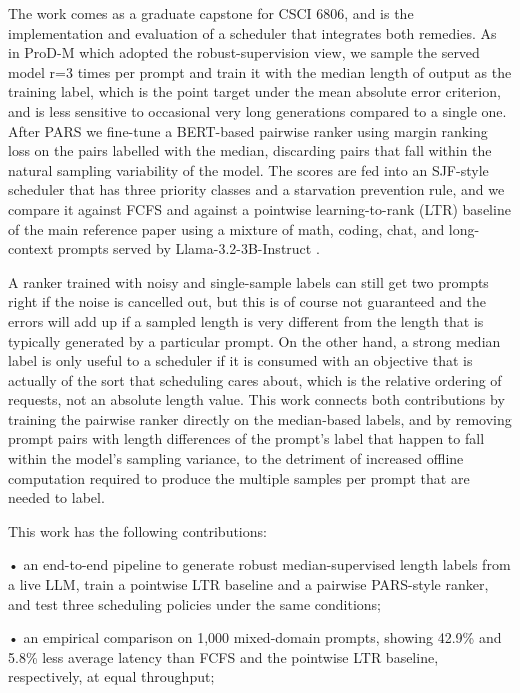 \documentclass[conference]{IEEEtran}
\begin{document}
The work comes as a graduate capstone for CSCI 6806, and is the implementation and evaluation of a scheduler that integrates both remedies. As in ProD-M \cite{wang2026prodm} which adopted the robust-supervision view, we sample the served model r=3 times per prompt and train it with the median length of output as the training label, which is the point target under the mean absolute error criterion, and is less sensitive to occasional very long generations compared to a single one. After PARS \cite{tao2025pars} we fine-tune a BERT-based pairwise ranker using margin ranking loss on the pairs labelled with the median, discarding pairs that fall within the natural sampling variability of the model. The scores are fed into an SJF-style scheduler that has three priority classes and a starvation prevention rule, and we compare it against FCFS and against a pointwise learning-to-rank (LTR) baseline of the main reference paper \cite{fu2024efficient} using a mixture of math, coding, chat, and long-context prompts served by Llama-3.2-3B-Instruct \cite{dubey2024llama3}.

A ranker trained with noisy and single-sample labels can still get two prompts right if the noise is cancelled out, but this is of course not guaranteed and the errors will add up if a sampled length is very different from the length that is typically generated by a particular prompt. On the other hand, a strong median label is only useful to a scheduler if it is consumed with an objective that is actually of the sort that scheduling cares about, which is the relative ordering of requests, not an absolute length value. This work connects both contributions by training the pairwise ranker directly on the median-based labels, and by removing prompt pairs with length differences of the prompt's label that happen to fall within the model's sampling variance, to the detriment of increased offline computation required to produce the multiple samples per prompt that are needed to label.

This work has the following contributions:

•	an end-to-end pipeline to generate robust median-supervised length labels from a live LLM, train a pointwise LTR baseline and a pairwise PARS-style ranker, and test three scheduling policies under the same conditions;

•	an empirical comparison on 1,000 mixed-domain prompts, showing 42.9\% and 5.8\% less average latency than FCFS and the pointwise LTR baseline, respectively, at equal throughput;
\end{document}
